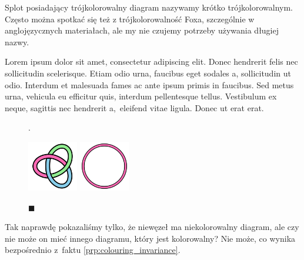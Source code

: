 Splot posiadający trójkolorowalny diagram nazywamy krótko trójkolorowalnym.
Często można spotkać się też z trójkolorowalność Foxa, szczególnie w anglojęzycznych materiałach, ale my nie czujemy potrzeby używania długiej nazwy.

\begin{examplenosquare}
    Lorem ipsum dolor sit amet, consectetur adipiscing elit. Donec hendrerit felis nec sollicitudin scelerisque. Etiam odio urna, faucibus eget sodales a, sollicitudin ut odio. Interdum et malesuada fames ac ante ipsum primis in faucibus. Sed metus urna, vehicula eu efficitur quis, interdum pellentesque tellus. Vestibulum ex neque, sagittis nec hendrerit a,~eleifend vitae ligula. Donec ut erat erat.
    \begin{figure}[H]
        \begin{minipage}[b]{.14\linewidth}
            {\hfill\color{white}.}
        \end{minipage}
        \begin{minipage}[b]{.35\linewidth}
            \centering
            \includegraphics[height=2.2cm]{../data/fox-coloring/3_1.png}
        \end{minipage}
        \begin{minipage}[b]{.35\linewidth}
            \centering
            \includegraphics[height=2.2cm]{../data/knots/0_1.png}
        \end{minipage}
        \begin{minipage}[b]{.14\linewidth}
            \hfill {\tiny\ensuremath{\blacksquare}}
        \end{minipage}
    \end{figure}
\end{examplenosquare}

Tak naprawdę pokazaliśmy tylko, że niewęzeł ma niekolorowalny diagram, ale czy nie może on mieć innego diagramu, który jest kolorowalny?
Nie może, co wynika bezpośrednio z~faktu \ref{prp:colouring_invariance}.

